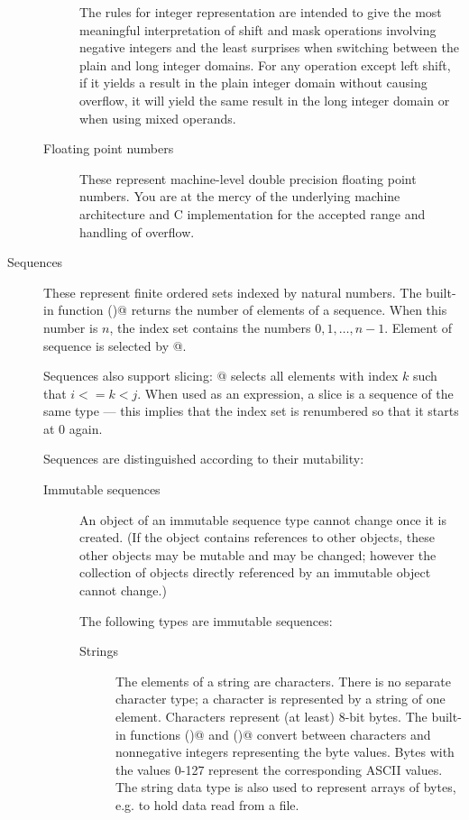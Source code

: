 \begin{description}
\begin{description}
The rules for integer representation are intended to give the most
meaningful interpretation of shift and mask operations involving
negative integers and the least surprises when switching between the
plain and long integer domains.  For any operation except left shift,
if it yields a result in the plain integer domain without causing
overflow, it will yield the same result in the long integer domain or
when using mixed operands.

\item[Floating point numbers]
These represent machine-level double precision floating point numbers.  
You are at the mercy of the underlying machine architecture and
C implementation for the accepted range and handling of overflow.

\end{description} %

\item[Sequences]
These represent finite ordered sets indexed by natural numbers.
The built-in function \verb@len()@ returns the number of elements
of a sequence.  When this number is $n$, the index set contains
the numbers $0, 1, \ldots, n-1$.  Element \verb@i@ of sequence
\verb@a@ is selected by \verb@a[i]@.

Sequences also support slicing: \verb@a[i:j]@ selects all elements
with index $k$ such that $i <= k < j$.  When used as an expression,
a slice is a sequence of the same type --- this implies that the
index set is renumbered so that it starts at 0 again.

Sequences are distinguished according to their mutability:

\begin{description}
%
\item[Immutable sequences]
An object of an immutable sequence type cannot change once it is
created.  (If the object contains references to other objects,
these other objects may be mutable and may be changed; however
the collection of objects directly referenced by an immutable object
cannot change.)

The following types are immutable sequences:

\begin{description}

\item[Strings]
The elements of a string are characters.  There is no separate
character type; a character is represented by a string of one element.
Characters represent (at least) 8-bit bytes.  The built-in
functions \verb@chr()@ and \verb@ord()@ convert between characters
and nonnegative integers representing the byte values.
Bytes with the values 0-127 represent the corresponding ASCII values.
The string data type is also used to represent arrays of bytes, e.g.
to hold data read from a file.


\end{description}
\end{description}
\end{description}
